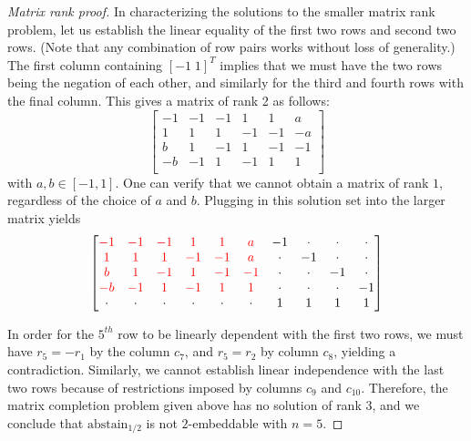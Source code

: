 \documentclass[anon]{colt2020} %
\newcommand{\abstain}[1]{\mathrm{abstain}_{#1}}
\begin{document}
\begin{proof}[Matrix rank proof]
  In characterizing the solutions to the smaller matrix rank problem, let us establish the linear equality of the first two rows and second two rows.
  (Note that any combination of row pairs works without loss of generality.)
  The first column containing $[-1 \; 1]^T$ implies that we must have the two rows being the negation of each other, and similarly for the third and fourth rows with the final column.
  This gives a matrix of rank 2 as follows:
  \[
    \begin{bmatrix}
  -1 & -1 & -1 & 1 & 1 & a \\
  1 & 1 & 1 & -1 & -1 & -a \\
  b & 1 & -1 & 1 & -1 & -1 \\
  -b & -1 & 1 & -1 & 1 & 1 \\
  \end{bmatrix}
  \] with $a, b \in [-1,1]$.
  One can verify that we cannot obtain a matrix of rank $1$, regardless of the choice of $a$ and $b$.
  Plugging in this solution set into the larger matrix yields
  \[
  \begin{bmatrix}
  {\color{red} -1} & {\color{red} -1} & {\color{red} -1} & {\color{red} 1} & {\color{red} 1} & {\color{red} a} & -1 & \cdot & \cdot & \cdot \\
  {\color{red} 1} & {\color{red} 1} & {\color{red} 1} & {\color{red} -1} & {\color{red} -1} & {\color{red} a} & \cdot & -1 & \cdot & \cdot \\
  {\color{red} b} & {\color{red} 1} & {\color{red} -1} & {\color{red} 1} & {\color{red} -1} & {\color{red} -1} & \cdot & \cdot & -1 & \cdot \\
  {\color{red} -b} & {\color{red} -1} & {\color{red} 1} & {\color{red} -1} & {\color{red} 1} & {\color{red} 1} & \cdot & \cdot & \cdot & -1 \\
  \cdot & \cdot & \cdot & \cdot & \cdot & \cdot & 1 & 1 & 1 & 1\\
  \end{bmatrix}
  \]

  In order for the $5^{th}$ row to be linearly dependent with the first two rows, we must have $r_5 = -r_1$ by the column $c_7$, and $r_5 = r_2$ by column $c_8$, yielding a contradiction.
  Similarly, we cannot establish linear independence with the last two rows because of restrictions imposed by columns $c_9$ and $c_{10}$.
  Therefore, the matrix completion problem given above has no solution of rank 3, and we conclude that $\abstain{1/2}$ is not $2$-embeddable with $n=5$.
\end{proof}
\end{document}
